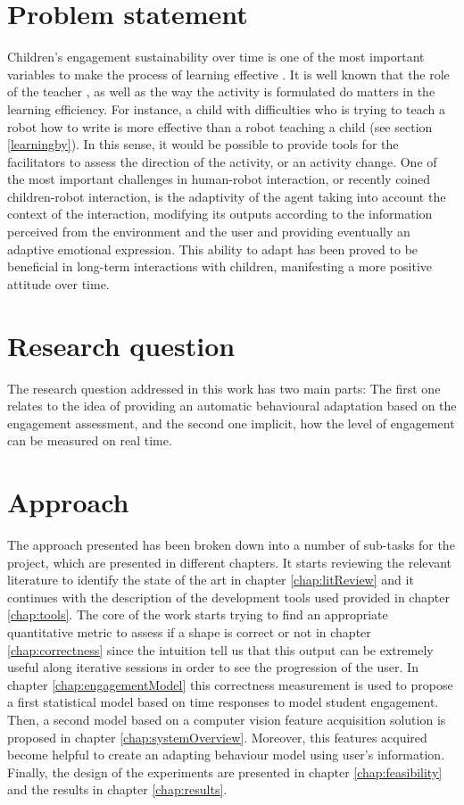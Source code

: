 \section{Problem statement}
Children's engagement sustainability over time is one of the most important variables to make the process of learning effective \cite{umbach2005faculty}. It is well known that the role of the teacher \cite{smith2005pedagogies}, as well as the way the activity is formulated do matters in the learning efficiency. For instance, a child with difficulties who is trying to teach a robot how to write is more effective than a robot teaching a child (see section \ref{learningby}). In this sense, it would be possible to provide tools for the facilitators to assess the direction of the activity, or an activity change.
One of the most important challenges in human-robot interaction, or recently coined children-robot interaction, is the adaptivity of the agent taking into account the context of the interaction, modifying its outputs according to the information perceived from the environment and the user and providing eventually an adaptive emotional expression. This ability to adapt has been proved to be beneficial in long-term interactions \cite{tielman2014adaptive} \cite{lim2014mei} with children, manifesting a more positive attitude over time.

\section{Research question}
The research question addressed in this work has two main parts: The first one relates to the idea of providing an automatic behavioural adaptation based on the engagement assessment, and the second one implicit, how the level of engagement can be measured on real time.

\section{Approach}
The approach presented has been broken down into a number of sub-tasks for the project,
which are presented in different chapters. It starts reviewing the relevant literature to identify the state of the art in chapter \ref{chap:litReview} and it continues with the description of the development tools used provided in chapter \ref{chap:tools}. 
The core of the work starts trying to find an appropriate quantitative metric to assess if a shape is correct or not in chapter \ref{chap:correctness} since the intuition tell us that this output can be extremely useful along iterative sessions in order to see the progression of the user. In chapter \ref{chap:engagementModel} this correctness measurement is used to propose a first statistical model based on time responses to model student engagement.
Then, a second model based on a computer vision feature acquisition solution is proposed in chapter \ref{chap:systemOverview}. Moreover, this features acquired become helpful to create an adapting behaviour model using user's information. Finally, the design of the experiments are presented in chapter \ref{chap:feasibility} and the results in chapter \ref{chap:results}.

